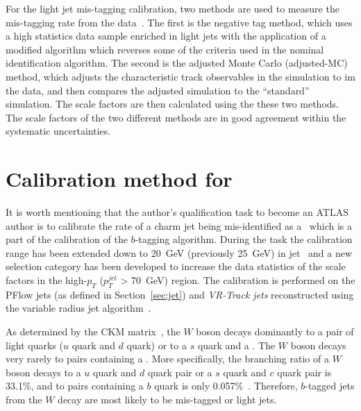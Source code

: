 For the light jet mis-tagging calibration, two methods are 
used to measure the mis-tagging rate from the data~\cite{ATLAS-CONF-2018-006}. 
The first is the negative tag method, which uses a high statistics data sample enriched 
in light jets with the application of a modified algorithm which 
reverses some of the criteria used in the nominal identification 
algorithm.
The second is the adjusted Monte Carlo (adjusted-MC) method, which 
adjusts the characteristic track observables in the simulation 
to im the data, and then compares the adjusted simulation to the 
``standard'' simulation. The scale factors are then calculated using 
the these two methods. The scale factors of the two different methods 
are in good agreement within the systematic uncertainties. 
\section{Calibration method for \texorpdfstring{\cjet}{c-jet}}
\label{sec:Calibration method for charm jet}
It is worth mentioning that the author's qualification task to become an ATLAS author is to 
calibrate the rate of a charm jet being mis-identified as a \bjet\, which is a part 
of the calibration of the $b$-tagging algorithm.
During the task the calibration range has been extended down to 20~GeV (previously 25~GeV) in
jet \pt\ and a new selection category has been developed 
to increase the data statistics of the scale factors in the 
high-$p_T$ ($p_T^{jet}$ > 70~GeV) region.
The calibration is performed on the PFlow jets (as defined in Section~\ref{sec:jet})
and \textit{VR-Track jets} reconstructed using the variable radius jet algorithm~\cite{VRTrackJet}.

As determined by the CKM matrix~\cite{CKM1,CKM2}, the $W$ boson decays dominantly to 
a pair of light quarks ($u$ quark and $d$ quark) or to
a $s$ quark and a \cquark. The $W$ boson decays very rarely to pairs containing a \bquark. 
More specifically, the branching ratio of a $W$ boson decays to a $u$ quark and $d$ quark pair or 
a $s$ quark and $c$ quark pair is 33.1\%, and to pairs containing a $b$ quark is only 0.057\%~\cite{PDG}. 
Therefore, $b$-tagged jets from the $W$ decay are most likely 
to be mis-tagged \cjets or light jets. 

